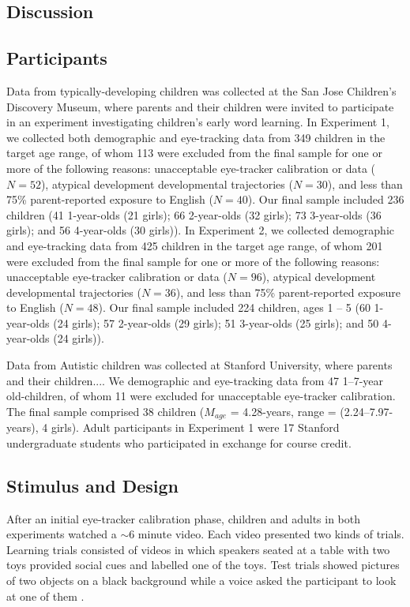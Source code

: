 \documentclass{pnastwo}
\begin{document}
\begin{article}
\section{Discussion}

\begin{materials}

\subsection{Participants} Data from typically-developing children was collected at the San Jose Children's Discovery Museum, where parents and their children were invited to participate in an experiment investigating children's early word learning. In Experiment 1, we collected both demographic and eye-tracking data from 349 children in the target age range, of whom 113 were excluded from the final sample for one or more of the following reasons: unacceptable eye-tracker calibration or data ($N=52$), atypical development developmental trajectories ($N=30$), and less than 75\% parent-reported exposure to English ($N=40$). Our final sample included 236 children (41 1-year-olds (21 girls); 66 2-year-olds (32 girls); 73 3-year-olds (36 girls); and 56 4-year-olds (30 girls)). In Experiment 2, we collected demographic and eye-tracking data from 425 children in the target age range, of whom 201 were excluded from the final sample for one or more of the following reasons: unacceptable eye-tracker calibration or data ($N=96$), atypical development developmental trajectories ($N=36$), and less than 75\% parent-reported exposure to English ($N=48$). Our final sample included 224 children, ages 1 -- 5 (60 1-year-olds (24 girls); 57 2-year-olds (29 girls); 51 3-year-olds (25 girls); and 50 4-year-olds (24 girls)).

Data from Autistic children was collected at Stanford University, where parents and their children.... We demographic and eye-tracking data from 47 1--7-year old-children, of whom 11 were excluded for unacceptable eye-tracker calibration. The final sample comprised 38 children ($M_{age}$ = 4.28-years, range = (2.24--7.97-years), 4 girls). Adult participants in Experiment 1 were 17 Stanford undergraduate students who participated in exchange for course credit.

\subsection{Stimulus and Design} After an initial eye-tracker calibration phase, children and adults in both experiments watched a $\sim$6 minute video. Each video presented two kinds of trials. Learning trials consisted of videos in which speakers seated at a table with two toys provided social cues and labelled one of the toys. Test trials showed pictures of two objects on a black background while a voice asked the participant to look at one of them \cite[as in][]{fernald1998}. 


\end{materials}
\end{article}
\end{document}
